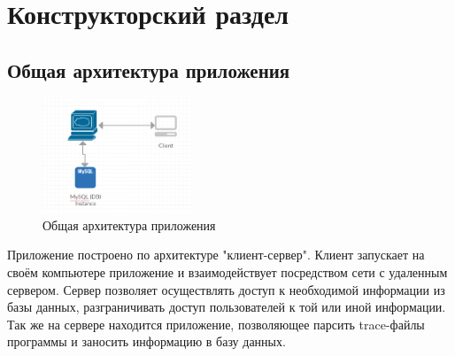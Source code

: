 \chapter{Конструкторский раздел}
\label{cha:design}
\section{Общая архитектура приложения}
\begin{figure}[h!]
	\centering
	\includegraphics[width=0.4\textwidth]{img/img5.png}
	\caption{Общая архитектура приложения}
	\label{fig:spire09}
\end{figure}
Приложение построено по архитектуре "клиент-сервер". Клиент запускает на своём компьютере приложение и взаимодействует посредством сети с удаленным сервером. Сервер позволяет осуществлять доступ к необходимой информации из базы данных, разграничивать доступ пользователей к той или иной информации. Так же на сервере находится приложение, позволяющее парсить trace-файлы программы и заносить информацию в базу данных.
